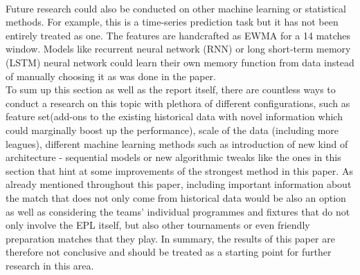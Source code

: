 \documentclass{article}
\begin{document}
\\
Future research could also be conducted on other machine learning or statistical methods. For example, this is a time-series prediction task but it has not been entirely treated as one. The features are handcrafted as EWMA for a 14 matches window. Models like recurrent neural network (RNN) or long short-term memory (LSTM) neural network could learn their own memory function from data instead of manually choosing it as was done in the paper.
\\
To sum up this section as well as the report itself, there are countless ways to conduct a research on this topic with plethora of different configurations, such as feature set(add-ons to the existing historical data with novel information which could marginally boost up the performance), scale of the data (including more leagues), different machine learning methods such as introduction of new kind of architecture - sequential models or new  algorithmic tweaks like the ones in this section that hint at some improvements of the strongest method in this paper. As already mentioned throughout this paper, including important information about the match that does not only come from historical data would be also an option as well as considering the teams' individual programmes and fixtures that do not only involve the EPL itself, but also other tournaments or even friendly preparation matches that they play. In summary, the results of this paper are therefore not conclusive and should be treated as a starting point for further research in this area.





\printbibliography
\end{document}
